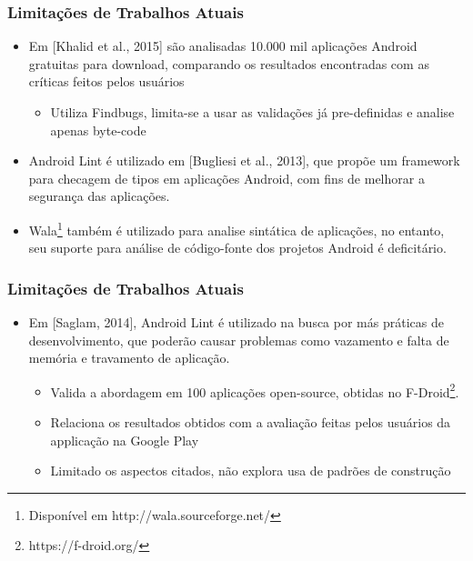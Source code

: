 \documentclass{beamer}
\begin{document}
    \frame
    {
        \frametitle{Limitações de Trabalhos Atuais}
        \begin{itemize}
            \item Em [Khalid et al., 2015] são analisadas 10.000 mil aplicações
            Android gratuitas para download, comparando os resultados encontradas 
            com as críticas feitos pelos usuários
            \begin{itemize}
                \item Utiliza Findbugs, limita-se a usar as validações já pre-definidas
                e analise apenas byte-code
            \end{itemize}
            \item Android Lint é utilizado em [Bugliesi et al., 2013], que propõe um framework
            para checagem de tipos em aplicações Android, com fins de melhorar a
            segurança das aplicações.
            \item Wala\footnote{Disponível em http://wala.sourceforge.net/} também
            é utilizado para analise sintática de aplicações, no entanto, seu suporte
            para análise de código-fonte dos projetos Android é deficitário.
        \end{itemize}
    }
    \frame
    {   
        \frametitle{Limitações de Trabalhos Atuais}
        \begin{itemize}
            \item Em [Saglam, 2014], Android Lint é utilizado na busca por más práticas
            de desenvolvimento, que poderão causar problemas como vazamento e falta
            de memória e travamento de aplicação.
            \begin{itemize}
                \item Valida a abordagem em 100 aplicações open-source, obtidas
                no F-Droid\footnote{https://f-droid.org/}.
                \item Relaciona os resultados obtidos com a avaliação feitas pelos
                usuários da applicação na Google Play
                \item Limitado os aspectos citados, não explora usa de padrões de
                construção
            \end{itemize}
        \end{itemize}
    }
    
\end{document}
